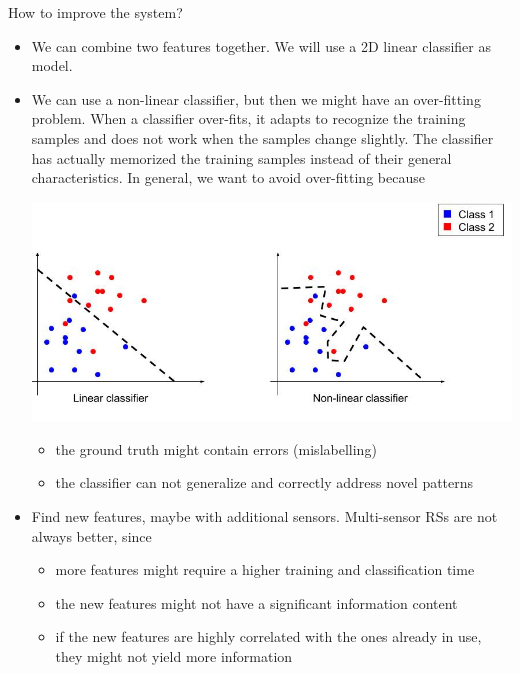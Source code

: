 \documentclass[oneside,onecolumn]{report}
\begin{document}
How to improve the system?
\begin{itemize}
    \item We can combine two features together. We will use a 2D linear classifier as model.

    \item We can use a non-linear classifier, but then we might have an over-fitting problem. When a classifier over-fits, it adapts to recognize the training samples and does not work when the samples change slightly. The classifier has actually memorized the training samples instead of their general characteristics. In general, we want to avoid over-fitting because

    \begin{center}
        \includegraphics[width=15cm]{2D_linear_classifier.jpg}
    \end{center}

    \begin{itemize}
        \item the ground truth might contain errors (mislabelling)
        \item the classifier can not generalize and correctly address novel patterns
    \end{itemize}

    \item Find new features, maybe with additional sensors. Multi-sensor RSs are not always better, since
    \begin{itemize}
        \item more features might require a higher training and classification time
        \item the new features might not have a significant information content
        \item if the new features are highly correlated with the ones already in use, they might not yield more information
    \end{itemize}
\end{itemize}
\end{document}

